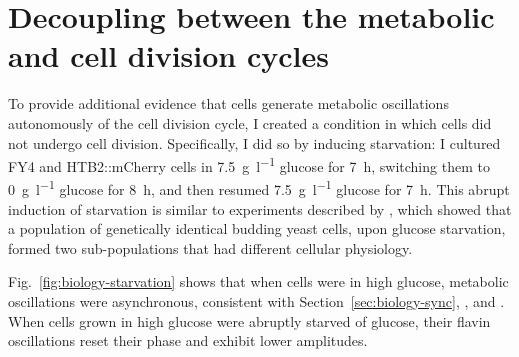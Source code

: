 \section{Decoupling between the metabolic and cell division cycles}
\label{sec:biology-abrupt}


To provide additional evidence that cells generate metabolic oscillations autonomously of the cell division cycle, I created a condition in which cells did not undergo cell division.
Specifically, I did so by inducing starvation: I cultured FY4 and HTB2::mCherry cells in \SI{7.5}{\gram~\litre^{-1}} glucose for \SI{7}{\hour}, switching them to \SI{0}{\gram~\litre^{-1}} glucose for \SI{8}{\hour}, and then resumed \SI{7.5}{\gram~\litre^{-1}} glucose for \SI{7}{\hour}.
This abrupt induction of starvation is similar to experiments described by \textcite{bagameryPutativeBetHedgingStrategy2020}, which showed that a population of genetically identical budding yeast cells, upon glucose starvation, formed two sub-populations that had different cellular physiology.

Fig.\ \ref{fig:biology-starvation} shows that when cells were in high glucose, metabolic oscillations were asynchronous, consistent with Section~\ref{sec:biology-sync}, \textcite{papagiannakisAutonomousMetabolicOscillations2017}, and \textcite{baumgartnerFlavinbasedMetabolicCycles2018}.
When cells grown in high glucose were abruptly starved of glucose, their flavin oscillations reset their phase and exhibit lower amplitudes.

